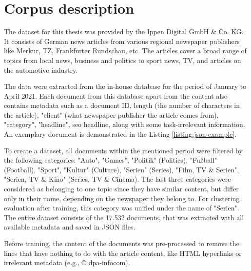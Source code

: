 \documentclass[fontsize=12pt,a4paper,twoside,openany]{scrbook}
\begin{document}
\section{Corpus description}
\label{sec:corp_exploration}

The dataset for this thesis was provided by the Ippen Digital GmbH \& Co. KG. It consists of German news articles from various regional newspaper publishers like Merkur, TZ, Frankfurter Rundschau, etc. The articles cover a broad range of topics from local news, business and politics to sport news, TV, and articles on the automotive industry.

The data were extracted from the in-house database for the period of January to April 2021. Each document from this database apart from the content also contains metadata such as a document ID, length (the number of characters in the article), "client" (what newspaper publisher the article comes from), "category", "headline", seo headline, along with some task-irrelevant information. An exemplary document is demonstrated in the Listing \ref{listing:json-example}.

To create a dataset, all documents within the mentioned period were filtered by the following categories: "Auto", "Games", "Politik" (Politics), "Fußball" (Football), "Sport", "Kultur" (Culture), "Serien" (Series), "Film, TV \& Serien", "Serien, TV \& Kino" (Series, TV \& Cinema). The last three categories were considered as belonging to one topic since they have similar content, but differ only in their name, depending on the newspaper they belong to. For clustering evaluation after training, this category was unified under the name of "Serien". The entire dataset consists of the 17.532 documents, that was extracted with all available metadata and saved in JSON files.

Before training, the content of the documents was pre-processed to remove the lines that have nothing to do with the article content, like HTML hyperlinks or irrelevant metadata (e.g., © dpa-infocom).
\end{document}
